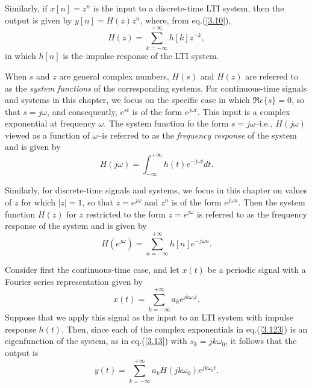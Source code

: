 \documentclass[a4paper,10pt,twoside]{book}
\begin{document}
Similarly, if $x[n]=z^n$ is the input to a discrete-time LTI system, then the output is given by $y[n]=H(z)z^n$, where, from eq.\;(\ref{3.10}),
\begin{equation}
    H(z)=\sum_{k=-\infty}^{+\infty}h[k]z^{-k},
    \label{3.120}
\end{equation}
in which $h[n]$ is the impulse response of the LTI system.

When $s$ and $z$ are general complex numbers, $H(s)$ and $H(z)$ are referred to as the \textit{system functions} of the corresponding systems. For continuous-time signals and systems in this chapter, we focus on the specific case in which $\Re e\{s\}=0$, so that $s=j\omega$, and consequently, $e^{st}$ is of the form $e^{j\omega t}$. This input is a complex exponential at frequency $\omega$. The system function fo the form $s=j\omega$--i.e., $H(j\omega)$ viewed as a function of $\omega$--is referred to as the \textit{frequency response} of the system and is given by
\begin{equation}
    H(j\omega)=\int_{-\infty}^{+\infty}h(t)e^{-j\omega t}dt.
    \label{3.121}
\end{equation}

Similarly, for discrete-time signals and systems, we focus in this chapter on values of $z$ for which $|z|=1$, so that $z=e^{j\omega}$ and $z^n$ is of the form $e^{j\omega n}$. Then the system function $H(z)$ for $z$ restricted to the form $z=e^{j\omega}$ is referred to as the frequency response of the system and is given by
\begin{equation}
    H(e^{j\omega})=\sum_{n=-\infty}^{+\infty}h[n]e^{-j\omega n}.
    \label{3.122}
\end{equation}

Consider first the continuous-time case, and let $x(t)$ be a periodic signal with a Fourier series representation given by
\begin{equation}
    x(t) = \sum_{k=-\infty}^{+\infty}a_ke^{jk\omega_0t}.
    \label{3.123}
\end{equation}
Suppose that we apply this signal as the input to an LTI system with impulse response $h(t)$. Then, since each of the complex exponentials in eq.\;(\ref{3.123}) is an eigenfunction of the system, as in eq.\;(\ref{3.13}) with $s_k=jk\omega_0$, it follows that the output is
\begin{equation}
    y(t)=\sum_{k=-\infty}^{+\infty}a_kH(jk\omega_0)e^{jk\omega_0t}.
    \label{3.124}
\end{equation}
\end{document}
